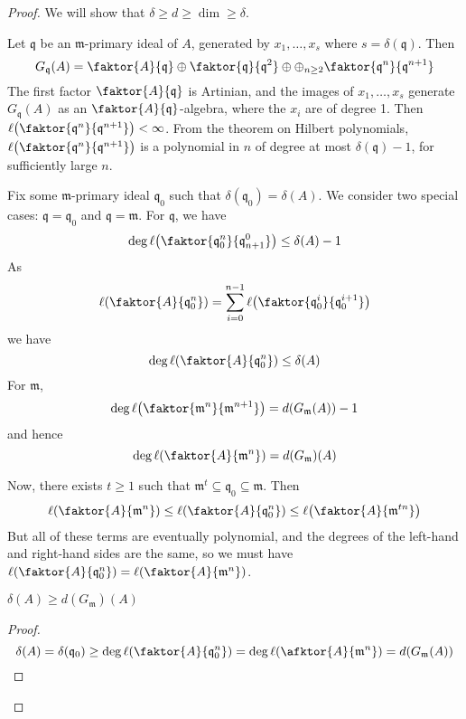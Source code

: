 \begin{proof}
    We will show that \( \delta \geq d \geq \dim \geq \delta \).

    Let \( \mathfrak q \) be an \( \mathfrak m \)-primary ideal of \( A \), generated by \( x_1, \dots, x_s \) where \( s = \delta(\mathfrak q) \).
    Then
    \[ G_{\mathfrak q}(A) = \faktor{A}{\mathfrak q} \oplus \faktor{\mathfrak q}{\mathfrak q^2} \oplus \oplus_{n \geq 2} \faktor{\mathfrak q^n}{\mathfrak q^{n+1}} \]
    The first factor \( \faktor{A}{\mathfrak q} \) is Artinian, and the images of \( x_1, \dots, x_s \) generate \( G_{\mathfrak q}(A) \) as an \( \faktor{A}{\mathfrak q} \)-algebra, where the \( x_i \) are of degree 1.
    Then \( \ell\qty(\faktor{\mathfrak q^n}{\mathfrak q^{n+1}}) < \infty \).
    From the theorem on Hilbert polynomials, \( \ell\qty(\faktor{\mathfrak q^n}{\mathfrak q^{n+1}}) \) is a polynomial in \( n \) of degree at most \( \delta(\mathfrak q) - 1 \), for sufficiently large \( n \).

    Fix some \( \mathfrak m \)-primary ideal \( \mathfrak q_0 \) such that \( \delta(\mathfrak q_0) = \delta(A) \).
    We consider two special cases: \( \mathfrak q = \mathfrak q_0 \) and \( \mathfrak q = \mathfrak m \).
    For \( \mathfrak q \), we have
    \[ \deg \ell\qty(\faktor{\mathfrak q_0^n}{\mathfrak q^0_{n+1}}) \leq \delta(A) - 1 \]
    As
    \[ \ell\qty(\faktor{A}{\mathfrak q_0^n}) = \sum_{i=0}^{n-1} \ell\qty(\faktor{\mathfrak q_0^i}{\mathfrak q_0^{i+1}}) \]
    we have
    \[ \deg \ell\qty(\faktor{A}{\mathfrak q_0^n}) \leq \delta(A) \]
    For \( \mathfrak m \),
    \[ \deg \ell\qty(\faktor{\mathfrak m^n}{\mathfrak m^{n+1}}) = d(G_{\mathfrak m}(A)) - 1 \]
    and hence
    \[ \deg \ell\qty(\faktor{A}{\mathfrak m^n}) = d(G_{\mathfrak m})(A) \]

    Now, there exists \( t \geq 1 \) such that \( \mathfrak m^t \subseteq \mathfrak q_0 \subseteq \mathfrak m \).
    Then
    \[ \ell\qty(\faktor{A}{\mathfrak m^n}) \leq \ell\qty(\faktor{A}{\mathfrak q_0^n}) \leq \ell\qty(\faktor{A}{\mathfrak m^{tn}}) \]
    But all of these terms are eventually polynomial, and the degrees of the left-hand and right-hand sides are the same, so we must have \( \ell\qty(\faktor{A}{\mathfrak q_0^n}) = \ell\qty(\faktor{A}{\mathfrak m^n}) \).

    \begin{proposition}
        \( \delta(A) \geq d(G_{\mathfrak m})(A) \)
    \end{proposition}
    \begin{proof}
        \[ \delta(A) = \delta(\mathfrak q_0) \geq \deg \ell\qty(\faktor{A}{\mathfrak q_0^n}) = \deg \ell\qty(\afktor{A}{\mathfrak m^n}) = d(G_{\mathfrak m}(A)) \]
    \end{proof}


\end{proof}

